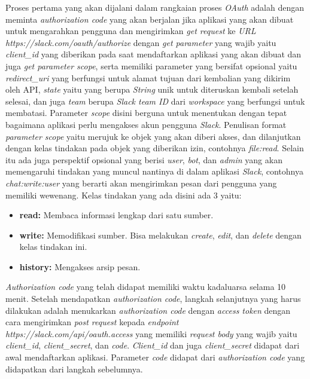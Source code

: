 \documentclass[a4paper,twoside]{article}
\begin{document}
\begin{enumerate}
		Proses pertama yang akan dijalani dalam rangkaian proses \textit{OAuth} adalah dengan meminta \textit{authorization code} yang akan berjalan jika aplikasi yang akan dibuat untuk mengarahkan pengguna dan mengirimkan \textit{get request} ke \textit{URL} \textit{https://slack.com/oauth/authorize} dengan \textit{get parameter} yang wajib yaitu \textit{client\_id} yang diberikan pada saat mendaftarkan aplikasi yang akan dibuat dan juga \textit{get parameter scope}, serta memiliki parameter yang bersifat opsional yaitu \textit{redirect\_uri} yang berfungsi untuk alamat tujuan dari kembalian yang dikirim oleh API, \textit{state} yaitu yang berupa \textit{String} unik untuk diteruskan kembali setelah selesai, dan juga \textit{team} berupa \textit{Slack team ID} dari \textit{workspace} yang berfungsi untuk membatasi. Parameter \textit{scope} disini berguna untuk menentukan dengan tepat bagaimana aplikasi perlu mengakses akun pengguna \textit{Slack}. Penulisan format \textit{parameter scope} yaitu merujuk ke objek yang akan diberi akses, dan dilanjutkan dengan kelas tindakan pada objek yang diberikan izin, contohnya \textit{file:read}. Selain itu ada juga perspektif opsional yang berisi \textit{user}, \textit{bot}, dan \textit{admin} yang akan memengaruhi tindakan yang muncul nantinya di dalam aplikasi \textit{Slack}, contohnya \textit{chat:write:user} yang berarti akan mengirimkan pesan dari pengguna yang memiliki wewenang. Kelas tindakan yang ada disini ada 3 yaitu:
\begin{itemize}
	\item \textbf{read:} Membaca informasi lengkap dari satu sumber. 
	\item \textbf{write:} Memodifikasi sumber. Bisa melakukan \textit{create}, \textit{edit}, dan \textit{delete} dengan kelas tindakan ini. 
	\item \textbf{history:} Mengakses arsip pesan. 
\end{itemize} 

\textit{Authorization code} yang telah didapat memiliki waktu kadaluarsa selama 10 menit. Setelah mendapatkan \textit{authorization code}, langkah selanjutnya yang harus dilakukan adalah menukarkan \textit{authorization code} dengan \textit{access token} dengan cara mengirimkan \textit{post request} kepada \textit{endpoint} \textit{https://slack.com/api/oauth.access} yang memiliki \textit{request body} yang wajib yaitu \textit{client\_id}, \textit{client\_secret}, dan \textit{code}. \textit{Client\_id} dan juga \textit{client\_secret} didapat dari awal mendaftarkan aplikasi. Parameter \textit{code} didapat dari \textit{authorization code} yang didapatkan dari langkah sebelumnya.


\end{enumerate}
\end{document}
